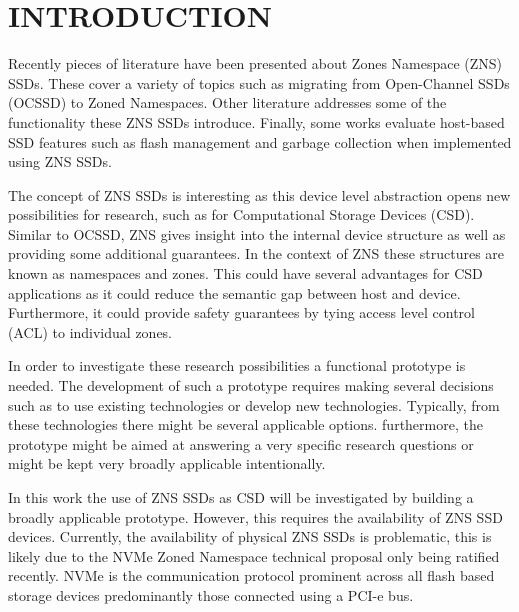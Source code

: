 \documentclass[conference]{IEEEtran}
\begin{document}
\clearpage
\onecolumn

\hypersetup{
	linkcolor=black
}

\renewcommand{\contentsname}{CONTENTS}
\tableofcontents{}

\hypersetup{
	linkcolor=blue
}

\twocolumn

\section*{INTRODUCTION}

Recently pieces of literature have been presented about Zones Namespace (ZNS)
SSDs. These cover a variety of topics such as migrating from Open-Channel
SSDs (OCSSD) to Zoned Namespaces\cite{bjorling2019open}. Other literature
addresses some of the functionality these ZNS SSDs
introduce\cite{bjorling2020zone}. Finally, some works evaluate host-based SSD
features such as flash management and garbage collection when implemented using
ZNS SSDs\cite{254268,9188086}.

The concept of ZNS SSDs is interesting as this device level abstraction opens
new possibilities for research, such as for Computational Storage Devices (CSD).
Similar to OCSSD, ZNS gives insight into the internal device structure as well
as providing some additional guarantees. In the context of ZNS these structures
are known as namespaces and zones. This could have several advantages for CSD
applications as it could reduce the semantic gap between host and device.
Furthermore, it could provide safety guarantees by tying access level control
(ACL) to individual zones.

In order to investigate these research possibilities a functional prototype is
needed. The development of such a prototype requires making several decisions
such as to use existing technologies or develop new technologies. Typically,
from these technologies there might be several applicable options. furthermore,
the prototype might be aimed at answering a very specific research questions or
might be kept very broadly applicable intentionally.

In this work the use of ZNS SSDs as CSD will be investigated by building a
broadly applicable prototype. However, this requires the availability of ZNS SSD
devices. Currently, the availability of physical ZNS SSDs is problematic, this
is likely due to the NVMe Zoned Namespace technical proposal only being ratified
recently\cite{zns-nvme-ratified}. NVMe is the communication protocol prominent
across all flash based storage devices predominantly those connected using a
PCI-e bus.
\end{document}
